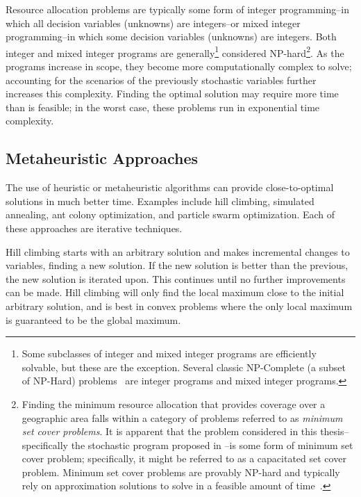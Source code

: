 \documentclass[12pt,dvipsnames]{report}
\begin{document}
Resource allocation problems are typically some form of integer programming--in which all decision variables (unknowns) are integers--or mixed integer programming--in which some decision variables (unknowns) are integers.  Both integer and mixed integer programs are generally\footnote{Some subclasses of integer and mixed integer programs are efficiently solvable, but these are the exception.  Several classic NP-Complete (a subset of NP-Hard) problems~\cite{Karp1972} are integer programs and mixed integer programs.} considered NP-hard\footnote{Finding the minimum resource allocation that provides coverage over a geographic area falls within a category of problems referred to as \emph{minimum set cover problems}.  It is apparent that the problem considered in this thesis--specifically the stochastic program proposed in --is some form of minimum set cover problem; specifically, it might be referred to as a capacitated set cover problem.  Minimum set cover problems are provably NP-hard and typically rely on approximation solutions to solve in a feasible amount of time~\cite{Korte:2007:CombOptimization}.}.  As the programs increase in scope, they become more computationally complex to solve; accounting for the scenarios of the previously stochastic variables further increases this complexity.  Finding the optimal solution may require more time than is feasible; in the worst case, these problems run in exponential time complexity.

\subsection{Metaheuristic Approaches} \label{subsec:optreview_meta}

The use of heuristic or metaheuristic algorithms can provide close-to-optimal solutions in much better time.  Examples include hill climbing, simulated annealing, ant colony optimization, and particle swarm optimization.  Each of these approaches are iterative techniques.

Hill climbing starts with an arbitrary solution and makes incremental changes to variables, finding a new solution.  If the new solution is better than the previous, the new solution is iterated upon.  This continues until no further improvements can be made.  Hill climbing will only find the local maximum close to the initial arbitrary solution, and is best in convex problems where the only local maximum is guaranteed to be the global maximum.
\end{document}
